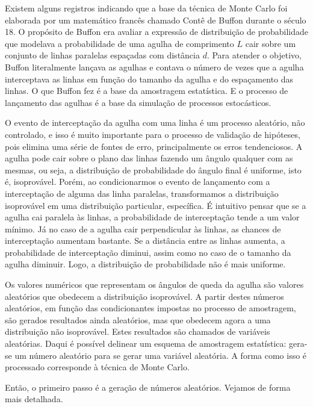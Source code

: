 \documentclass[a4paper,12pt,oneside,onecolumn]{uerj}
\begin{document}
Existem alguns registros indicando que a base da técnica de Monte Carlo foi elaborada por um matemático francês chamado Contê de Buffon durante o século 18. O propósito de Buffon era avaliar a expressão de distribuição de probabilidade que modelava a probabilidade de uma agulha de comprimento $L$ cair sobre um conjunto de linhas paralelas espaçadas com distância $d$. Para atender o objetivo, Buffon literalmente lançava as agulhas e contava o número de vezes que a agulha interceptava as linhas em função do tamanho da agulha e do espaçamento das linhas. O que Buffon fez é a base da amostragem estatística. E o processo de lançamento das agulhas é a base da simulação de processos estocásticos.

O evento de interceptação da agulha com uma linha é um processo aleatório, não controlado, e isso é muito importante para o processo de validação de hipóteses, pois elimina uma série de fontes de erro, principalmente os erros tendenciosos. A agulha pode cair sobre o plano das linhas fazendo um ângulo qualquer com as mesmas, ou seja, a distribuição de probabilidade do ângulo final é uniforme, isto é, isoprovável. Porém, ao condicionarmos o evento de lançamento com a interceptação de alguma das linha paralelas, transformamos a distribuição isoprovável em uma distribuição particular, específica. É intuitivo pensar que se a agulha cai paralela às linhas, a probabilidade de interceptação tende a um valor mínimo. Já no caso de a agulha cair perpendicular às linhas, as chances de interceptação aumentam bastante. Se a distância entre as linhas aumenta, a probabilidade de interceptação diminui, assim como no caso de o tamanho da agulha diminuir. Logo, a distribuição de probabilidade não é mais uniforme.

Os valores numéricos que representam os ângulos de queda da agulha são valores aleatórios que obedecem a distribuição isoprovável. A partir destes números aleatórios, em função das condicionantes impostas no processo de amostragem, são gerados resultados ainda aleatórios, mas que obedecem agora a uma distribuição não isoprovável. Estes resultados são chamados de variáveis aleatórias. Daqui é possível delinear um esquema de amostragem estatística: gera-se um número aleatório para se gerar uma variável aleatória. A forma como isso é processado corresponde à técnica de Monte Carlo.

Então, o primeiro passo é a geração de números aleatórios. Vejamos de forma mais detalhada.

\end{document}
